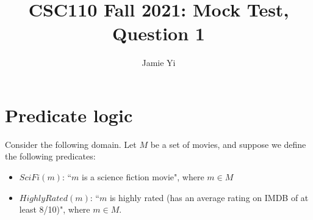 \documentclass{article}
\title{CSC110 Fall 2021: Mock Test, Question 1}
\author{Jamie Yi}
\begin{document}
\maketitle

\section*{Predicate logic}

Consider the following domain.
Let $M$ be a set of movies, and suppose we define the following predicates:

\begin{itemize}
\item $SciFi(m)$: ``$m$ is a science fiction movie", where $m \in M$
\item $HighlyRated(m)$: ``$m$ is highly rated (has an average rating on IMDB of at least 8/10)", where $m \in M$.
\end{itemize}
\end{document}
